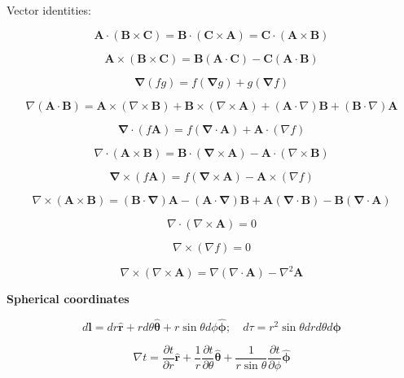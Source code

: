 \documentclass[11pt]{article}
\begin{document}
Vector identities:

\[
\mathbf { A } \cdot ( \mathbf { B } \times \mathbf { C } ) = \mathbf { B } \cdot ( \mathbf { C } \times \mathbf { A } ) = \mathbf { C } \cdot ( \mathbf { A } \times \mathbf { B } )
\]


\[
\mathbf { A } \times ( \mathbf { B } \times \mathbf { C } ) = \mathbf { B } ( \mathbf { A } \cdot \mathbf { C } ) - \mathbf { C } ( \mathbf { A } \cdot \mathbf { B } )
\]


\[
\boldsymbol { \nabla } ( f g ) = f ( \boldsymbol { \nabla } g ) + g ( \boldsymbol { \nabla } f )
\]


\[
\nabla ( \mathbf { A } \cdot \mathbf { B } ) = \mathbf { A } \times ( \nabla \times \mathbf { B } ) + \mathbf { B } \times ( \nabla \times \mathbf { A } ) + ( \mathbf { A } \cdot \nabla ) \mathbf { B } + ( \mathbf { B } \cdot \nabla ) \mathbf { A }
\]


\[
\boldsymbol { \nabla } \cdot ( f \mathbf { A } ) = f ( \mathbf { \nabla } \cdot \mathbf { A } ) + \mathbf { A } \cdot ( \nabla f )
\]


\[
\nabla \cdot ( \mathbf { A } \times \mathbf { B } ) = \mathbf { B } \cdot ( \mathbf { \nabla } \times \mathbf { A } ) - \mathbf { A } \cdot ( \nabla \times \mathbf { B } )
\]


\[
\boldsymbol { \nabla } \times ( f \mathbf { A } ) = f ( \mathbf { \nabla } \times \mathbf { A } ) - \mathbf { A } \times ( \nabla f )
\]


\[
\nabla \times ( \mathbf { A } \times \mathbf { B } ) = ( \mathbf { B } \cdot \mathbf { \nabla } ) \mathbf { A } - ( \mathbf { A } \cdot \mathbf { \nabla } ) \mathbf { B } + \mathbf { A } ( \mathbf { \nabla } \cdot \mathbf { B } ) - \mathbf { B } ( \mathbf { \nabla } \cdot \mathbf { A } )
\]


\[
\nabla \cdot ( \nabla \times \mathbf { A } ) = 0
\]


\[
\nabla \times ( \nabla f ) = 0
\]


\[
\nabla \times ( \nabla \times \mathbf { A } ) = \nabla ( \nabla \cdot \mathbf { A } ) - \nabla ^ { 2 } \mathbf { A }
\]

\newpage

{\bf Spherical coordinates}

\[
d \mathbf { l } = d r \hat { \mathbf { r } } + r d \theta \hat { \boldsymbol { \theta } } + r \sin \theta d \phi \hat { \boldsymbol { \phi } } ; \quad d \tau = r ^ { 2 } \sin \theta d r d \theta d \boldsymbol { \phi }
\]


\[
\nabla t = \frac { \partial t } { \partial r } \hat { \mathbf { r } } + \frac { 1 } { r } \frac { \partial t } { \partial \theta } \hat { \boldsymbol { \theta } } + \frac { 1 } { r \sin \theta } \frac { \partial t } { \partial \phi } \hat { \boldsymbol { \phi } }
\]
\end{document}
